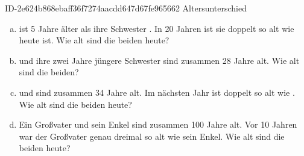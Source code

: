 \begin{exercise}
      {ID-2e624b868ebaff36f7274aacdd647d67fe965662}
      {Altersunterschied}
  \ifproblem\problem
    \begin{enumerate}[a)]
      \item \xxa{} ist 5 Jahre älter als ihre Schwester \xxb{}. In 20 Jahren ist sie
            doppelt so alt wie \xxb{} heute ist. Wie alt sind die beiden heute?
      \item \xxc{} und ihre zwei Jahre jüngere Schwester \xxd{} sind zusammen 28 Jahre alt.
            Wie alt sind die beiden?
      \item \xya{} und \xyb{} sind zusammen 34 Jahre alt. Im nächsten Jahr ist \xya{}
            doppelt so alt wie \xyb{}. Wie alt sind die beiden heute?
      \item Ein Großvater und sein Enkel sind zusammen 100 Jahre alt. Vor 10 Jahren
            war der Großvater genau dreimal so alt wie sein Enkel. Wie alt sind die
            beiden heute?
    \end{enumerate}
  \fi
\end{exercise}
